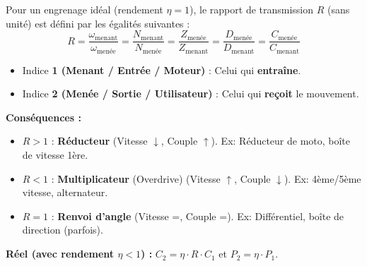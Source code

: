 \documentclass[11pt]{article}
\newcommand{\cle}[1]{{\popxbold\color{popdark}#1}}
\begin{document}
\begin{propriete}
    Pour un engrenage idéal (rendement $\eta = 1$), le \cle{rapport de transmission} $R$ (sans unité) est défini par les égalités suivantes :
    \[
    R = \frac{\omega_{\text{menant}}}{\omega_{\text{menée}}} = \frac{N_{\text{menant}}}{N_{\text{menée}}} = \frac{Z_{\text{menée}}}{Z_{\text{menant}}} = \frac{D_{\text{menée}}}{D_{\text{menant}}} = \frac{C_{\text{menée}}}{C_{\text{menant}}}
    \]
    \begin{itemize}
        \item Indice \textbf{1 (Menant / Entrée / Moteur)} : Celui qui \textbf{entraîne}.
        \item Indice \textbf{2 (Menée / Sortie / Utilisateur)} : Celui qui \textbf{reçoit} le mouvement.
    \end{itemize}
    \textbf{Conséquences :}
    \begin{itemize}
        \item $R > 1$ : \textbf{Réducteur} (Vitesse $\downarrow$, Couple $\uparrow$). Ex: Réducteur de moto, boîte de vitesse 1ère.
        \item $R < 1$ : \textbf{Multiplicateur} (Overdrive) (Vitesse $\uparrow$, Couple $\downarrow$). Ex: 4ème/5ème vitesse, alternateur.
        \item $R = 1$ : \textbf{Renvoi d'angle} (Vitesse =, Couple =). Ex: Différentiel, boîte de direction (parfois).
    \end{itemize}
    \textbf{Réel (avec rendement $\eta < 1$) :} $C_2 = \eta \cdot R \cdot C_1$ \quad et \quad $P_2 = \eta \cdot P_1$.
\end{propriete}
\end{document}

